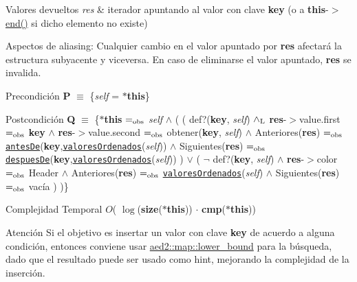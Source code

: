 \begin{DoxyRetVals}{Valores devueltos}
{\em res} & iterador apuntando al valor con clave {\bfseries key} (o a {\bfseries this}-\/$>$\hyperlink{classaed2_1_1map_a76023e6a56cb625513e1b5ea028bf983_a76023e6a56cb625513e1b5ea028bf983}{end()} si dicho elemento no existe)\\
\hline
\end{DoxyRetVals}
\begin{DoxyParagraph}{Aspectos de aliasing\-:}
Cualquier cambio en el valor apuntado por {\bfseries res} afectará la estructura subyacente y viceversa. En caso de eliminarse el valor apuntado, {\bfseries res} se invalida.
\end{DoxyParagraph}
\begin{DoxyPrecond}{Precondición}
{\bfseries P} $\equiv$ \{{\itshape self} = {\bfseries $\ast$this}\} 
\end{DoxyPrecond}
\begin{DoxyPostcond}{Postcondición}
{\bfseries Q} $\equiv$ \{{\bfseries $\ast$this} $=_{\rm obs}$ {\itshape self} $\land$ ( ( def?({\bfseries key}, {\itshape self}) $\land_{\rm L}$ {\bfseries res}-\/$>$value.\-first $=_{\rm obs}$ {\bfseries key} $\land$ {\bfseries res}-\/$>$value.\-second $=_{\rm obs}$ obtener({\bfseries key}, {\itshape self}) $\land$ Anteriores({\bfseries res}) $=_{\rm obs}$ \href{axiomas.html#antesDe}{\tt antes\-De}({\bfseries key},\href{axiomas.html#valoresOrdenados}{\tt valores\-Ordenados}({\itshape self})) $\land$ Siguientes({\bfseries res}) $=_{\rm obs}$ \href{axiomas.html#despuesDe}{\tt despues\-De}({\bfseries key},\href{axiomas.html#valoresOrdenados}{\tt valores\-Ordenados}({\itshape self})) ) $\lor$ ( $\lnot$ def?({\bfseries key}, {\itshape self}) $\land$ {\bfseries res}-\/$>$color $=_{\rm obs}$ Header $\land$ Anteriores({\bfseries res}) $=_{\rm obs}$ \href{axiomas.html#valoresOrdenados}{\tt valores\-Ordenados}({\itshape self}) $\land$ Siguientes({\bfseries res}) $=_{\rm obs}$ vacía ) )\}
\end{DoxyPostcond}

\begin{DoxyDescription}
\item[Complejidad Temporal]$O$( $\log$({\bfseries size}({\bfseries $\ast$this})) $\cdot$ {\bfseries cmp}({\bfseries $\ast$this}))
\end{DoxyDescription}

\begin{DoxyAttention}{Atención}
Si el objetivo es insertar un valor con clave {\bfseries key} de acuerdo a alguna condición, entonces conviene usar \hyperlink{classaed2_1_1map_a3399d36fdd5a880b494f3a5795d3f18f_a3399d36fdd5a880b494f3a5795d3f18f}{aed2\-::map\-::lower\-\_\-bound} para la búsqueda, dado que el resultado puede ser usado como hint, mejorando la complejidad de la inserción. 
\end{DoxyAttention}


